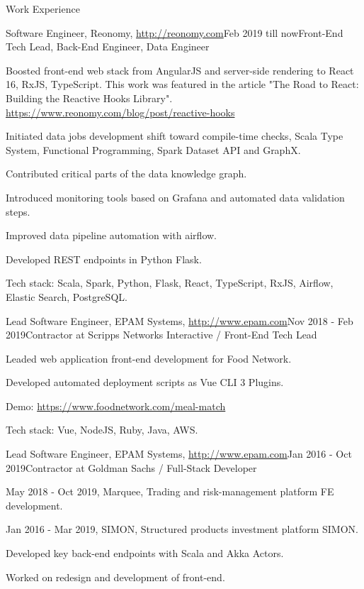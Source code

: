 \documentclass{resume}
\begin{document}
\begin{rSection}{Work Experience}

\begin{rSubsection}{Software Engineer, Reonomy, \url{http://reonomy.com}}{Feb 2019 till now}{Front-End Tech Lead, Back-End Engineer, Data Engineer}{}
\item Boosted front-end web stack from AngularJS and server-side rendering to React 16, RxJS, TypeScript.
This work was featured in the article "The Road to React: Building the Reactive Hooks Library".
\url{https://www.reonomy.com/blog/post/reactive-hooks}
\item Initiated data jobs development shift toward compile-time checks, 
Scala Type System, Functional Programming, Spark Dataset API and GraphX.
\item Contributed critical parts of the data knowledge graph.
\item Introduced monitoring tools based on Grafana and automated data validation steps. 
\item Improved data pipeline automation with airflow.
\item Developed REST endpoints in Python Flask.

Tech stack: Scala, Spark, Python, Flask, React, TypeScript, RxJS, Airflow, Elastic Search, PostgreSQL.
\end{rSubsection}

\begin{rSubsection}{Lead Software Engineer, EPAM Systems, \url{http://www.epam.com}}{Nov 2018 - Feb 2019}{Contractor at Scripps Networks Interactive / Front-End Tech Lead}{}
\item Leaded web application front-end development for Food Network.
\item Developed automated deployment scripts as Vue CLI 3 Plugins.

Demo: \url{https://www.foodnetwork.com/meal-match}

Tech stack: Vue, NodeJS, Ruby, Java, AWS.
\end{rSubsection}

\begin{rSubsection}{Lead Software Engineer, EPAM Systems, \url{http://www.epam.com}}{Jan 2016 - Oct 2019}{Contractor at Goldman Sachs / Full-Stack Developer}{}
\item May 2018 - Oct 2019, Marquee, Trading and risk-management platform FE development.

\item Jan 2016 - Mar 2019, SIMON, Structured products investment platform SIMON.
\item Developed key back-end endpoints with Scala and Akka Actors.
\item Worked on redesign and development of front-end.


\end{rSubsection}
\end{rSection}
\end{document}
